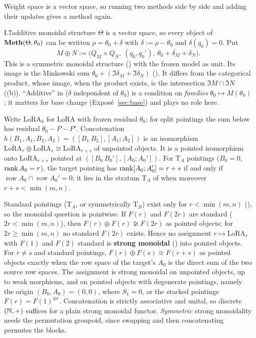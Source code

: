 Weight space is a vector space, so running two methods side by side and adding their updates gives a method again.

\begin{observation}{I.7}{additive monoidal structure}
$\Theta$ is a vector space, so every object of $\mathbf{Meth}(\Theta,\theta_0)$ can be written $\rho=\theta_0+\delta$ with
$\delta:=\rho-\theta_0$ and $\delta(q_0)=0$. Put
\begin{equation*}
  M\oplus N:=\big(Q_M\times Q_N,\ (q_0,q_0'),\ \theta_0+\delta_M+\delta_N\big).
\end{equation*}
This is a symmetric monoidal structure () with the frozen model as unit. Its image is the Minkowski sum
$\theta_0+(\Im\delta_M+\Im\delta_N)$ (). It differs from the categorical product, whose image, when the
product exists, is the intersection $\Im M\cap\Im N$ ((b)). ``Additive'' in
 ($\delta$ independent of $\theta_0$) is a condition on \emph{families}
$\theta_0\mapsto M(\theta_0)$; it matters for base change (Exposé~\ref{sec:base}) and plays no role here.

Write $\mathrm{LoRA}_k$ for LoRA with frozen residual $\theta_0$; for split pointings the sum below has residual
$\theta_0-P-P'$. Concatenation $h(B_1,A_1,B_2,A_2)=([B_1\ B_2],[A_1;A_2])$ is an isomorphism
$\mathrm{LoRA}_r\oplus\mathrm{LoRA}_s\cong\mathrm{LoRA}_{r+s}$ of unpointed objects. It is a pointed isomorphism onto
$\mathrm{LoRA}_{r+s}$ pointed at $([B_0\ B_0'],[A_0;A_0'])$. For $\mathrm T_A$ pointings ($B_0=0$, $\operatorname{rank} A_0=r$), the
target pointing has $\operatorname{rank}[A_0;A_0']=r+s$ if and only if $\operatorname{row}A_0\cap\operatorname{row}A_0'=0$; it lies in the
stratum $\mathrm T_A$ of  when moreover $r+s<\min(m,n)$.

Standard pointings ($\mathrm T_A$, or symmetrically $\mathrm T_B$) exist only for $r<\min(m,n)$ (),
so the monoidal question is pointwise. If $F(r)$ and $F(2r)$ are standard ($2r<\min(m,n)$), then
$F(r)\oplus F(r)\not\cong F(2r)$ as pointed objects; for $2r\ge\min(m,n)$ no standard $F(2r)$ exists. Hence no assignment
$r\mapsto\mathrm{LoRA}_r$ with $F(1)$ and $F(2)$ standard is \textbf{strong monoidal} () into pointed objects.
For $r\neq s$ and standard pointings, $F(r)\oplus F(s)\cong F(r+s)$ as pointed objects exactly when the row space of the
target's $A_0$ is the direct sum of the two source row spaces. The assignment is strong monoidal on unpointed objects, up to
weak morphisms, and on pointed objects with degenerate pointings, namely the origin $(B_0,A_0)=(0,0)$, where $S_1=0$, or
the stacked pointings $F(r)=F(1)^{\oplus r}$. Concatenation is strictly associative and unital, so discrete $(\mathbb{N},+)$
suffices for a plain strong monoidal functor. \emph{Symmetric} strong monoidality needs the permutation groupoid, since
swapping and then concatenating permutes the blocks.


\end{observation}
